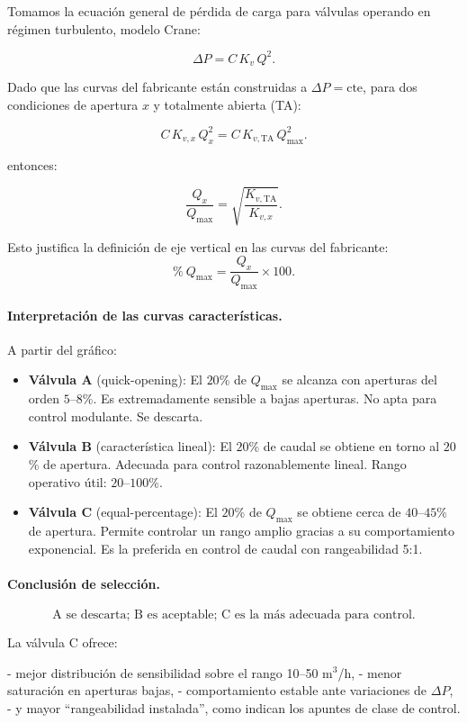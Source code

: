 \documentclass[12pt, a4paper]{article}
\begin{document}
Tomamos la ecuación general de pérdida de carga para válvulas operando
en régimen turbulento, modelo Crane:

\[
\Delta P = C\,K_v\,Q^2.
\]

Dado que las curvas del fabricante están construidas a $\Delta P=\text{cte}$, para dos
condiciones de apertura $x$ y totalmente abierta (TA):

\[
C\,K_{v,x}\,Q_x^2 = C\,K_{v,\mathrm{TA}}\,Q_{\max}^2.
\]

entonces:

\[
\frac{Q_x}{Q_{\max}}
= 
\sqrt{\frac{K_{v,\mathrm{TA}}}{K_{v,x}}}.
\]

Esto justifica la definición de eje vertical en las curvas del fabricante:
\[
\%\ Q_{\max} = \frac{Q_x}{Q_{\max}}\times 100.
\]

\bigskip

\paragraph{Interpretación de las curvas características.}

A partir del gráfico:

\begin{itemize}
  \item \textbf{Válvula A} (quick-opening):  
        El $20$\% de $Q_{\max}$ se alcanza con aperturas del orden $5$–$8$\%.  
        Es extremadamente sensible a bajas aperturas.  
        No apta para control modulante. Se descarta.
  \item \textbf{Válvula B} (característica lineal):  
        El $20$\% de caudal se obtiene en torno al $20$\% de apertura.  
        Adecuada para control razonablemente lineal.  
        Rango operativo útil: $20$–$100$\%.
  \item \textbf{Válvula C} (equal-percentage):  
        El $20$\% de $Q_{\max}$ se obtiene cerca de $40$–$45$\% de apertura.  
        Permite controlar un rango amplio gracias a su comportamiento exponencial.  
        Es la preferida en control de caudal con rangeabilidad 5:1.
\end{itemize}

\paragraph{Conclusión de selección.}

\[
\boxed{
\text{A se descarta; B es aceptable; C es la más adecuada para control.}
}
\]

La válvula C ofrece:

- mejor distribución de sensibilidad sobre el rango 10–50 m$^3$/h,  
- menor saturación en aperturas bajas,  
- comportamiento estable ante variaciones de $\Delta P$,  
- y mayor “rangeabilidad instalada”, como indican los apuntes de clase de control.
\end{document}
